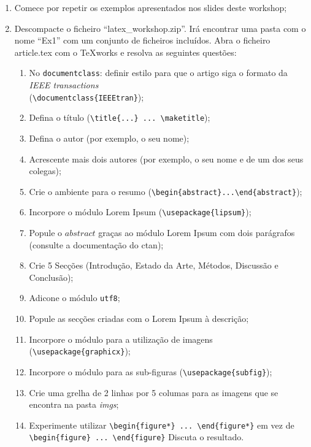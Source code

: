 \begin{enumerate}
\item Comece por repetir os exemplos apresentados nos slides deste workshop;
\item Descompacte o ficheiro ``latex\_workshop.zip''. Irá encontrar uma pasta com o nome ``Ex1'' com um conjunto de ficheiros incluídos. Abra o ficheiro article.tex com o TeXworks e resolva as seguintes questões:
\begin{enumerate}
  \item\label{one:one} No \verb!documentclass!: definir estilo para que o artigo siga o formato da \emph{IEEE transactions}\\ (\verb!\documentclass{IEEEtran}!);
  \item Defina o título (\verb!\title{...} ... \maketitle!);
  \item Defina o autor (por exemplo, o seu nome);
  \item Acrescente mais dois autores (por exemplo, o seu nome e de um dos seus colegas);
  \item\label{one:five} Crie o ambiente para o resumo (\verb!\begin{abstract}...\end{abstract}!);
  \item Incorpore o módulo Lorem Ipsum (\verb!\usepackage{lipsum}!);
  \item Popule o $abstract$ graças ao módulo Lorem Ipsum com dois parágrafos (consulte a documentação do ctan);
  \item Crie 5 Secções (Introdução, Estado da Arte, Métodos, Discussão e Conclusão);
  \item Adicone o módulo \verb!utf8!;
  \item Popule as secções criadas com o Lorem Ipsum à descrição;
  \item Incorpore o módulo para a utilização de imagens (\verb!\usepackage{graphicx}!);
  \item Incorpore o módulo para as sub-figuras (\verb!\usepackage{subfig}!);
  \item Crie uma grelha de 2 linhas por 5 columas para as imagens que se encontra na pasta \emph{imgs};
  \item Experimente utilizar \verb!\begin{figure*} ... \end{figure*}! em vez de \verb!\begin{figure} ... \end{figure}! Discuta o resultado.

\end{enumerate}
\end{enumerate}
